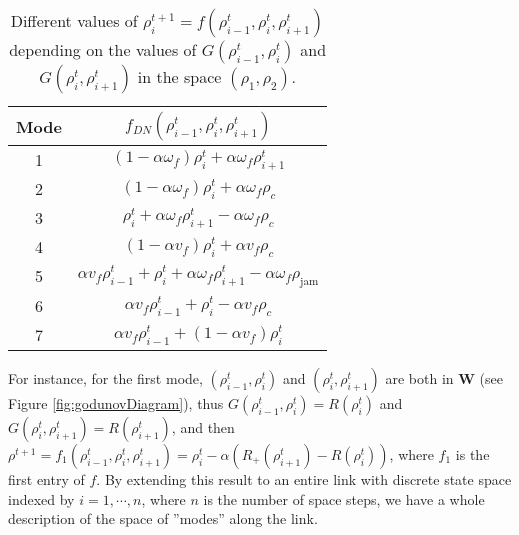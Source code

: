\begin{table}[here]
\centering %
\begin{tabular}{c c} %
\hline\hline %
Mode & $f_{DN}(\rho^{t}_{i-1},\rho^{t}_{i},\rho^{t}_{i+1})$ \\ [0.5ex]%
\hline %
1 & $(1 - \alpha \omega_{f})\rho^{t}_{i} + \alpha \omega_{f} \rho^{t}_{i+1}$ \\ [1ex]
2 & $(1 - \alpha \omega_{f})\rho^{t}_{i} + \alpha \omega_{f} \rho_{c}$ \\ [1ex]
3 & $\rho^{t}_{i} + \alpha \omega_{f}\rho^{t}_{i+1} - \alpha \omega_{f}\rho_{c}$ \\ [1ex]
4 & $(1 - \alpha v_{f})\rho^{t}_{i} + \alpha v_{f} \rho_{c}$ \\ [1ex]
5 & $\alpha v_{f} \rho^{t}_{i-1} + \rho^{t}_{i} + \alpha \omega_{f} \rho^{t}_{i+1} - \alpha \omega_{f} \rho_{\text{jam}}$ \\ [1ex]
6 & $\alpha v_{f} \rho^{t}_{i-1} + \rho^{t}_{i} - \alpha v_{f} \rho_{c}$ \\ [1ex]
7 & $\alpha v_{f} \rho^{t}_{i-1} + (1 - \alpha v_{f})\rho^{t}_{i}$ \\ [1ex]%
\hline %
\end{tabular}
\label{table:modesDN} %
\caption{Different values of $\rho^{t+1}_{i} = f(\rho^{t}_{i-1},\rho^{t}_{i},\rho^{t}_{i+1})$ depending on the values of $G(\rho^{t}_{i-1},\rho^{t}_{i})$ and $G(\rho^{t}_{i},\rho^{t}_{i+1})$ in the space $(\rho_{1},\rho_{2})$.}
\end{table}

For instance, for the first mode, $(\rho^{t}_{i-1}, \rho^{t}_{i})$ and $(\rho^{t}_{i}, \rho^{t}_{i+1})$ are both in \textbf{W} (see Figure \ref{fig:godunovDiagram}), thus $G(\rho^{t}_{i-1}, \rho^{t}_{i}) = R(\rho^{t}_{i})$ and $G(\rho^{t}_{i}, \rho^{t}_{i+1}) = R(\rho^{t}_{i+1})$, and then $\rho^{t+1} = f_{1}(\rho^{t}_{i-1},\rho^{t}_{i},\rho^{t}_{i+1}) = \rho^{t}_{i} - \alpha(R_{+}(\rho^{t}_{i+1})-R(\rho^{t}_{i}))$, where $f_{1}$ is the first entry of $f$. By extending this result to an entire link with discrete state space indexed by $i = 1,\cdots,n$, where $n$ is the number of space steps, we have a whole description of the space of ''modes'' along the link. 

\hspace{10mm}

